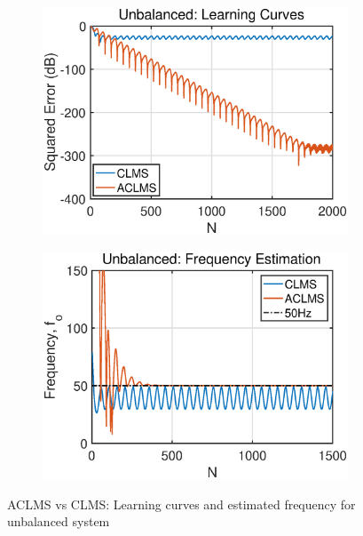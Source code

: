\begin{figure}[htb]
    \centering
    \hspace{-0.4cm}
    \begin{subfigure}[b]{0.32\textwidth}
     \centering
     \includegraphics[width=1.2\textwidth]{fig/31/31e3.eps}
    \end{subfigure}
    \hspace{1.4cm}
    \begin{subfigure}[b]{0.32\textwidth}
     \centering
     \includegraphics[width=1.2\textwidth]{fig/31/31e4.eps}
    \end{subfigure}  
    \caption{ACLMS vs CLMS: Learning curves and estimated frequency for unbalanced system}
    \label{fig:3_1_e2}
\end{figure}










